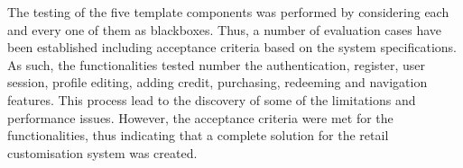 The testing of the five template components was performed by considering each and every one of them as blackboxes. Thus, a number of evaluation cases have been established including acceptance criteria based on the system specifications. As such, the functionalities tested number the authentication, register, user session, profile editing, adding credit, purchasing, redeeming and navigation features. This process lead to the discovery of some of the limitations and performance issues. However, the acceptance criteria were met for the functionalities, thus indicating that a complete solution for the retail customisation system was created.








